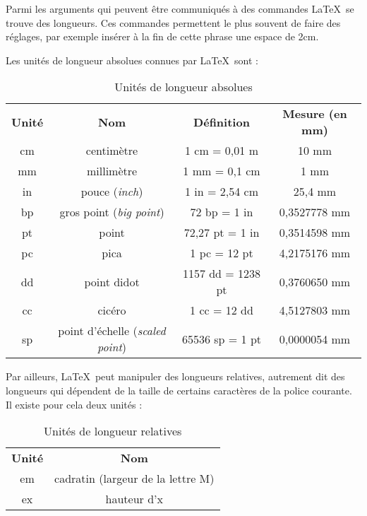 Parmi les arguments qui peuvent être communiqués à des commandes \LaTeX\ se trouve des longueurs. Ces  commandes permettent le plus souvent de faire des réglages, par exemple insérer à la fin de cette phrase une espace de 2cm\hspace*{2cm}. 

Les unités de longueur absolues connues par \LaTeX\ sont :

\begin{table}[!ht]
\begin{tablecouleur}
\begin{tabular}{cccc}
\rowcolor{bleu20}
\color{white}\bf Unité		& \color{white}\bf  Nom		& \color{white}\bf Définition & \color{white}\bf	Mesure (en mm) \\ 
cm				& centimètre							&	1 cm = 0,01 m	& 10 mm 		\\
mm				& millimètre							&	1 mm = 0,1 cm	& 1 mm			\\
in				& pouce (\emph{inch})					&	1 in = 2,54 cm 	& 25,4 mm		\\
bp				& gros point (\emph{big point})			&	72 bp = 1 in 	& 0,3527778 mm	\\
pt				& point                					&	72,27 pt = 1 in & 0,3514598 mm 	\\ 	
pc				& pica 									&	1 pc = 12 pt 	& 4,2175176 mm	\\ 
dd				& point didot							& 1157 dd = 1238 pt & 0,3760650 mm  \\
cc				& cicéro								&	1 cc = 12 dd 	& 4,5127803 mm  \\
sp				& point d'échelle (\emph{scaled point})	& 65536 sp = 1 pt	& 0,0000054 mm\\
\end{tabular}
\end{tablecouleur}
\caption{Unités de longueur absolues} \label{unitesabsolues}
\end{table}

Par ailleurs, \LaTeX\ peut manipuler des longueurs relatives, autrement dit des longueurs qui dépendent de la taille de certains caractères de la police courante. Il existe pour cela deux unités :

\begin{table}[!ht]
\begin{tablecouleur}
\begin{tabular}{cc}
\rowcolor{bleu20}
\color{white}\bf Unité		& \color{white}\bf  Nom					\\ 
em							& cadratin (largeur de la lettre M)		\\ 	
ex							& hauteur d'x							\\ 
\end{tabular}
\end{tablecouleur}
\caption{Unités de longueur relatives} \label{unitesrelatives}
\end{table}

